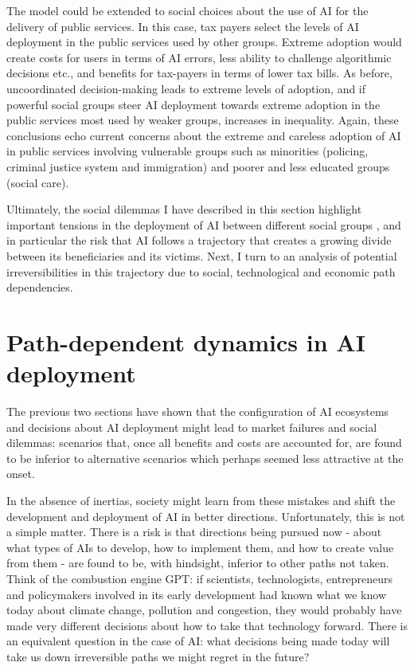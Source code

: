 \documentclass[11pt]{article}
\begin{document}
The model could be extended to social choices about the use of AI for the delivery of public services. In this case, tax payers select the levels of AI deployment in the public services used by other groups. Extreme adoption would create costs for users in terms of AI errors, less ability to challenge algorithmic decisions etc., and benefits for tax-payers in terms of lower tax bills. As before, uncoordinated decision-making leads to extreme levels of adoption, and if powerful social groups steer AI deployment towards extreme adoption in the public services most used by weaker groups, increases in inequality. Again, these conclusions echo current concerns about the extreme and careless adoption of AI in public services involving vulnerable groups such as minorities (policing, criminal justice system and immigration) and poorer and less educated groups (social care).

Ultimately, the social dilemmas I have described in this section highlight important tensions in the deployment of AI between different social groups , and in particular the risk that AI follows a trajectory that creates a growing divide between its beneficiaries and its victims. Next, I turn to an analysis of potential irreversibilities in this trajectory due to social, technological and economic path dependencies. 

\section{Path-dependent dynamics in AI deployment}
\label{subsec:irreversible}
The previous two sections have shown that the configuration of AI ecosystems and decisions about AI deployment might lead to market failures and social dilemmas: scenarios that, once all benefits and costs are accounted for, are found to be inferior to alternative scenarios which perhaps seemed less attractive at the onset. 

In the absence of inertias, society might learn from these mistakes and shift the development and deployment of AI in better directions.  Unfortunately, this is not a simple matter. There is a risk is that directions being pursued now - about what types of AIs to develop, how to implement them, and how to create value from them - are found to be, with hindsight, inferior to other paths not taken. Think of the combustion engine GPT: if scientists, technologists, entrepreneurs and policymakers involved in its early development had known what we know today about climate change, pollution and congestion, they would probably have made very different decisions about how to take that technology forward. There is an equivalent question in the case of AI: what decisions being made today will take us down irreversible paths we might regret in the future?
\end{document}
